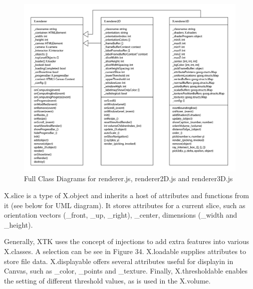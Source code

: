 \documentclass[a4paper,11pt,titlepage]{article}
\begin{document}
\begin{figure}[ht!]
\centering
\includegraphics[width=170mm]{graphics/xtkUML_01.png}
\caption{Full Class Diagrams for renderer.js, renderer2D.js and renderer3D.js}
\label{fig:UIdesign1}
\end{figure}


X.slice is a type of X.object and inherits a host of attributes and functions from it (see below for UML diagram). It stores attributes for a current slice, such as orientation vectors (\_front, \_up, \_right), \_center, dimensions (\_width and \_height).

Generally, XTK uses the concept of injections to add extra features into various X.classes. A selection can be see in Figure 34. X.loadable supplies attributes to store file data. X.displayable offers several attributes useful for displayin in Canvas, such as \_color, \_points and \_texture. Finally, X.thresholdable enables the setting of different threshold values, as is used in the X.volume.
\end{document}
